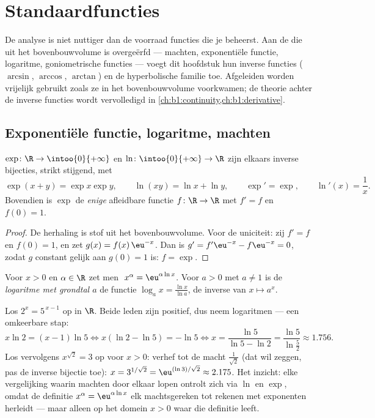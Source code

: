 \chapter{Standaardfuncties}\label{ch:b1:functions}

De analyse is niet nuttiger dan de voorraad functies die je beheerst. Aan
de  die uit het bovenbouwvolume is overgeërfd --- machten,
exponentiële functie, logaritme, goniometrische functies --- voegt dit
hoofdstuk hun inverse functies ($\arcsin$, $\arccos$, $\arctan$) en de
hyperbolische familie toe. Afgeleiden worden vrijelijk gebruikt zoals ze
in het bovenbouwvolume voorkwamen; de theorie achter de inverse functies
wordt vervolledigd in \cref{ch:b1:continuity,ch:b1:derivative}.

\section{Exponentiële functie, logaritme, machten}

\begin{proposition}\label{prop:b1:functions:expln}
$\exp \colon \R \to \intoo{0}{+\infty}$ en $\ln \colon
\intoo{0}{+\infty} \to \R$ zijn elkaars inverse bijecties, strikt
stijgend, met
\[
\exp(x + y) = \exp x \exp y, \qquad \ln(xy) = \ln x + \ln y,
\qquad \exp' = \exp, \qquad \ln'(x) = \frac 1x .
\]
Bovendien is $\exp$ de \emph{enige} afleidbare functie $f \colon \R \to
\R$ met $f' = f$ en $f(0) = 1$.
\end{proposition}

\begin{proof}
De herhaling is stof uit het bovenbouwvolume. Voor de uniciteit: zij $f'
= f$ en $f(0) = 1$, en zet $g(x) = f(x)\,\eu^{-x}$. Dan is $g' =
f'\eu^{-x} - f\eu^{-x} = 0$, zodat $g$ constant gelijk aan $g(0) = 1$
is: $f = \exp$.
\end{proof}

\begin{definition}\label{def:b1:functions:powers}
Voor $x > 0$ en $\alpha \in \R$ zet men $\;x^\alpha = \eu^{\alpha \ln
x}$. Voor $a > 0$ met $a \neq 1$ is de
\emph{logaritme met grondtal $a$} de functie $\log_a x = \frac{\ln
x}{\ln a}$, de inverse van $x \mapsto a^x$.
\end{definition}

\begin{example}\label{ex:b1:functions:expequations}
Los $2^x = 5^{\,x-1}$ op in $\R$. Beide leden zijn positief, dus neem
logaritmen --- een omkeerbare stap:
\[
x\ln2 = (x - 1)\ln5
\iff x(\ln2 - \ln5) = -\ln5
\iff x = \frac{\ln5}{\ln5 - \ln2} = \frac{\ln 5}{\ln\frac52}
\approx 1.756 .
\]
Los vervolgens $x^{\sqrt2} = 3$ op voor $x > 0$: verhef tot de macht
$\frac1{\sqrt2}$ (dat wil zeggen, pas de inverse bijectie toe): $x =
3^{1/\sqrt2} = \eu^{(\ln 3)/\sqrt2} \approx 2.175$. Het inzicht: elke
vergelijking waarin machten door elkaar lopen ontrolt zich via $\ln$ en
$\exp$, omdat de definitie $x^\alpha = \eu^{\alpha\ln x}$ elk
machtsgereken tot rekenen met exponenten herleidt --- maar alleen op
het domein $x > 0$ waar die definitie leeft.
\end{example}

